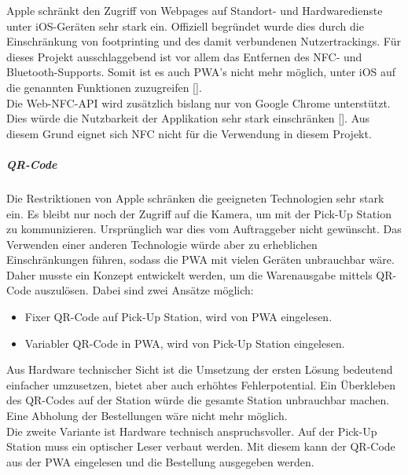 Apple schränkt den Zugriff von Webpages auf Standort- und Hardwaredienste unter iOS-Geräten sehr stark ein. Offiziell begründet wurde dies durch die Einschränkung von footprinting und des damit verbundenen Nutzertrackings. Für dieses Projekt ausschlaggebend ist vor allem das Entfernen des NFC- und Bluetooth-Supports. Somit ist es auch \gls{PWA}'s nicht mehr möglich, unter iOS auf die genannten Funktionen zuzugreifen [\cite{webKitTracking}].\\
Die Web-NFC-API wird zusätzlich bislang nur von Google Chrome unterstützt. Dies würde die Nutzbarkeit der Applikation sehr stark einschränken [\cite{kompWebNFC}]. 
Aus diesem Grund eignet sich \ac{NFC} nicht für die Verwendung in diesem Projekt. 
\subparagraph{QR-Code}\label{qrcode}
Die Restriktionen von Apple schränken die geeigneten Technologien sehr stark ein. Es bleibt nur noch der Zugriff auf die Kamera, um mit der Pick-Up Station zu kommunizieren. Ursprünglich war dies vom Auftraggeber nicht gewünscht. Das Verwenden einer anderen Technologie würde aber zu erheblichen Einschränkungen führen, sodass die \gls{PWA} mit vielen Geräten unbrauchbar wäre. \\
Daher musste ein Konzept entwickelt werden, um die Warenausgabe mittels QR-Code auszulösen. Dabei sind zwei Ansätze möglich: 
\begin{itemize}
	\item Fixer QR-Code auf Pick-Up Station, wird von \gls{PWA} eingelesen. 
	\item Variabler QR-Code in \gls{PWA}, wird von Pick-Up Station eingelesen. 
\end{itemize}
Aus Hardware technischer Sicht ist die Umsetzung der ersten Lösung bedeutend einfacher umzusetzen, bietet aber auch erhöhtes Fehlerpotential. Ein Überkleben des QR-Codes auf der Station würde die gesamte Station unbrauchbar machen. Eine Abholung der Bestellungen wäre nicht mehr möglich. \\
Die zweite Variante ist Hardware technisch anspruchsvoller. Auf der Pick-Up Station muss ein optischer Leser verbaut werden. Mit diesem kann der QR-Code aus der \gls{PWA} eingelesen und die Bestellung ausgegeben werden. \\

